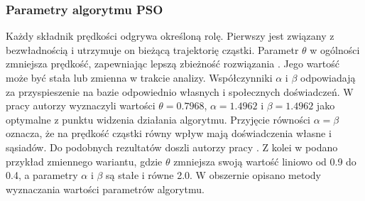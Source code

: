 \subsubsection{Parametry algorytmu PSO}
Każdy składnik prędkości odgrywa określoną rolę. Pierwszy jest związany z bezwładnością i utrzymuje on bieżącą trajektorię cząstki. Parametr $\theta$ w ogólności zmniejsza prędkość, zapewniając lepszą zbieżność rozwiązania \parencite{Blackwell2019}. Jego wartość może być stała lub zmienna w trakcie analizy. Współczynniki $\alpha$ i $\beta$ odpowiadają za przyspieszenie na bazie odpowiednio własnych i społecznych doświadczeń. 
W pracy \cite{Clerc2002} autorzy wyznaczyli wartości $\theta=0.7968$, $\alpha=1.4962$ i $\beta=1.4962$ jako optymalne z punktu widzenia działania algorytmu. Przyjęcie równości $\alpha=\beta$ oznacza, że na prędkość cząstki równy wpływ mają doświadczenia własne i sąsiadów. Do podobnych rezultatów doszli autorzy pracy \cite{Shi1998}. Z kolei w \cite{Xu2007} podano przykład zmiennego wariantu, gdzie $\theta$ zmniejsza swoją wartość liniowo od 0.9 do 0.4, a parametry $\alpha$ i $\beta$ są stałe i równe 2.0. W \cite{Poli2007} obszernie opisano metody wyznaczania wartości parametrów algorytmu.
